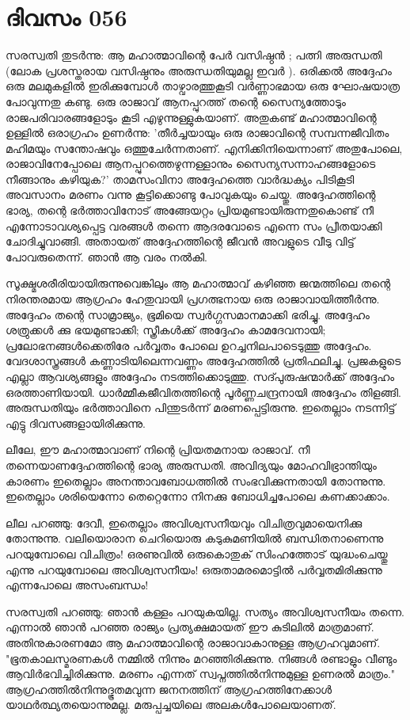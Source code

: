  
\section{ദിവസം 056}


സരസ്വതി തുടര്‍ന്നു: ആ മഹാത്മാവിന്റെ പേര്‍ വസിഷ്ഠന്‍ ; പത്നി അരുന്ധതി (ലോക പ്രശസ്തരായ വസിഷ്ഠനും അരുന്ധതിയുമല്ല ഇവര്‍ ). ഒരിക്കല്‍ അദ്ദേഹം ഒരു മലമുകളില്‍ ഇരിക്കുമ്പോള്‍ താഴ്വാരത്തുകൂടി വര്‍ണ്ണാഭമായ ഒരു ഘോഷയാത്ര പോവുന്നതു കണ്ടു. ഒരു രാജാവ്‌ ആനപ്പുറത്ത്‌ തന്റെ സൈന്യത്തോടും രാജപരിവാരങ്ങളോടും കൂടി എഴുന്നുള്ളുകയാണ്‌. അതുകണ്ട്‌ മഹാത്മാവിന്റെ ഉള്ളില്‍ ഒരാഗ്രഹം ഉണര്‍ന്നു: 'തീര്‍ച്ചയായും ഒരു രാജാവിന്റെ സമ്പന്നജീവിതം മഹിമയും സന്തോഷവും ഒത്തുചേര്‍ന്നതാണ്‌. എനിക്കിനിയെന്നാണ്‌ അതുപോലെ, രാജാവിനേപ്പോലെ ആനപ്പുറത്തെഴുന്നള്ളാനും സൈന്യസന്നാഹങ്ങളോടെ നീങ്ങാനും കഴിയുക?' താമസംവിനാ അദ്ദേഹത്തെ വാര്‍ദ്ധക്യം പിടികൂടി അവസാനം മരണം വന്നു കൂട്ടിക്കൊണ്ടു പോവുകയും ചെയ്തു. അദ്ദേഹത്തിന്റെ ഭാര്യ, തന്റെ ഭര്‍ത്താവിനോട്‌ അങ്ങേയറ്റം പ്രിയമുണ്ടായിരുന്നതുകൊണ്ട്‌ നീ എന്നോടാവശ്യപ്പെട്ട വരങ്ങള്‍ തന്നെ ആദരവോടെ എന്നെ സം പ്രീതയാക്കി ചോദിച്ചുവാങ്ങി. അതായത്‌ അദ്ദേഹത്തിന്റെ ജീവന്‍ അവളുടെ വീടു വിട്ട്‌ പോവരുതെന്ന്. ഞാന്‍ ആ വരം നല്‍കി. 

സൂക്ഷ്മശരീരിയായിരുന്നുവെങ്കിലും ആ മഹാത്മാവ്‌ കഴിഞ്ഞ ജന്മത്തിലെ തന്റെ നിരന്തരമായ ആഗ്രഹം ഹേതുവായി പ്രഗത്ഭനായ ഒരു രാജാവായിത്തീര്‍ന്നു. അദ്ദേഹം തന്റെ സാമ്രാജ്യം, ഭൂമിയെ സ്വര്‍ഗ്ഗസമാനമാക്കി ഭരിച്ചു. അദ്ദേഹം ശത്രുക്കള്‍ ക്കു ഭയമുണ്ടാക്കി; സ്ത്രീകള്‍ക്ക്‌ അദ്ദേഹം കാമദേവനായി; പ്രലോഭനങ്ങള്‍ക്കെതിരേ പര്‍വ്വതം പോലെ ഉറച്ചനിലപാടെടുത്തു അദ്ദേഹം. വേദശാസ്ത്രങ്ങള്‍ കണ്ണാടിയിലെന്നവണ്ണം അദ്ദേഹത്തില്‍ പ്രതിഫലിച്ചു. പ്രജകളുടെ എല്ലാ ആവശ്യങ്ങളും അദ്ദേഹം നടത്തിക്കൊടുത്തു. സദ്പുരുഷന്മാര്‍ക്ക്‌ അദ്ദേഹം ഒരത്താണിയായി. ധാര്‍മ്മീകജീവിതത്തിന്റെ പൂര്‍ണ്ണചന്ദ്രനായി അദ്ദേഹം തിളങ്ങി. അരുന്ധതിയും ഭര്‍ത്താവിനെ പിന്തുടര്‍ന്ന് മരണപ്പെട്ടിരുന്നു. ഇതെല്ലാം നടന്നിട്ട്‌ എട്ടു ദിവസങ്ങളായിരിക്കുന്നു.

ലീലേ, ഈ മഹാത്മാവാണ്‌ നിന്റെ പ്രിയതമനായ രാജാവ്‌. നീ തന്നെയാണദ്ദേഹത്തിന്റെ ഭാര്യ അരുന്ധതി. അവിദ്യയും മോഹവിഭ്രാന്തിയും കാരണം ഇതെല്ലാം അനന്താവബോധത്തില്‍ സംഭവിക്കുന്നതായി തോന്നുന്നു. ഇതെല്ലാം ശരിയെന്നോ തെറ്റെന്നോ നിനക്കു ബോധിച്ചപോലെ കണക്കാക്കാം. 

ലീല പറഞ്ഞു: ദേവീ, ഇതെല്ലാം അവിശ്വസനീയവും വിചിത്രവുമായെനിക്കു തോന്നുന്നു. വലിയൊരാന ചെറിയൊരു കടുകുമണിയില്‍ ബന്ധിതനാണെന്നു പറയുമ്പോലെ വിചിത്രം! ഒരണുവില്‍ ഒരുകൊതുക്‌ സിംഹത്തോട്‌ യുദ്ധംചെയ്തു എന്നു പറയുമ്പോലെ അവിശ്വസനീയം! ഒരുതാമരമൊട്ടില്‍ പര്‍വ്വതമിരിക്കുന്നു എന്നപോലെ അസംബന്ധം!

സരസ്വതി പറഞ്ഞു: ഞാന്‍ കള്ളം പറയുകയില്ല. സത്യം അവിശ്വസനീയം തന്നെ. എന്നാല്‍ ഞാന്‍ പറഞ്ഞ രാജ്യം പ്രത്യക്ഷമായത്‌ ഈ കുടിലില്‍ മാത്രമാണ്‌. അതിനുകാരണമോ ആ മഹാത്മാവിന്റെ രാജാവാകാനുള്ള ആഗ്രഹവുമാണ്‌. "ഭൂതകാലസ്മരണകള്‍ നമ്മില്‍ നിന്നും മറഞ്ഞിരിക്കുന്നു. നിങ്ങള്‍ രണ്ടാളും വീണ്ടും ആവിര്‍ഭവിച്ചിരിക്കുന്നു. മരണം എന്നത്‌ സ്വപ്നത്തില്‍നിന്നുമുള്ള ഉണരല്‍ മാത്രം." ആഗ്രഹത്തില്‍നിന്നുദ്ഭൂതമവുന്ന ജനനത്തിന്‌ ആഗ്രഹത്തിനേക്കാള്‍ യാഥര്‍ത്ഥ്യതയൊന്നുമല്ല. മരുപ്പച്ചയിലെ അലകള്‍പോലെയാണത്‌.
